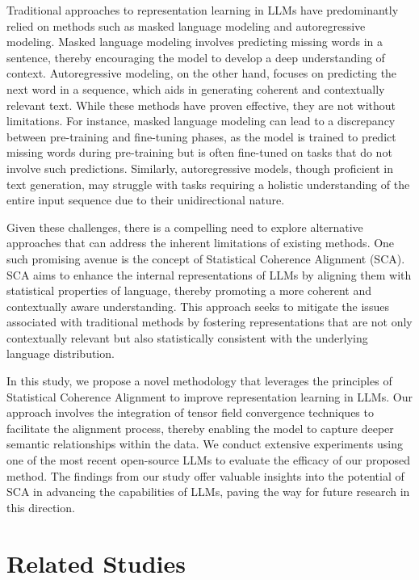 \documentclass{article}
\begin{document}
Traditional approaches to representation learning in LLMs have predominantly relied on methods such as masked language modeling and autoregressive modeling. Masked language modeling involves predicting missing words in a sentence, thereby encouraging the model to develop a deep understanding of context. Autoregressive modeling, on the other hand, focuses on predicting the next word in a sequence, which aids in generating coherent and contextually relevant text. While these methods have proven effective, they are not without limitations. For instance, masked language modeling can lead to a discrepancy between pre-training and fine-tuning phases, as the model is trained to predict missing words during pre-training but is often fine-tuned on tasks that do not involve such predictions. Similarly, autoregressive models, though proficient in text generation, may struggle with tasks requiring a holistic understanding of the entire input sequence due to their unidirectional nature.

Given these challenges, there is a compelling need to explore alternative approaches that can address the inherent limitations of existing methods. One such promising avenue is the concept of Statistical Coherence Alignment (SCA). SCA aims to enhance the internal representations of LLMs by aligning them with statistical properties of language, thereby promoting a more coherent and contextually aware understanding. This approach seeks to mitigate the issues associated with traditional methods by fostering representations that are not only contextually relevant but also statistically consistent with the underlying language distribution.

In this study, we propose a novel methodology that leverages the principles of Statistical Coherence Alignment to improve representation learning in LLMs. Our approach involves the integration of tensor field convergence techniques to facilitate the alignment process, thereby enabling the model to capture deeper semantic relationships within the data. We conduct extensive experiments using one of the most recent open-source LLMs to evaluate the efficacy of our proposed method. The findings from our study offer valuable insights into the potential of SCA in advancing the capabilities of LLMs, paving the way for future research in this direction.




\section{Related Studies}
\end{document}
